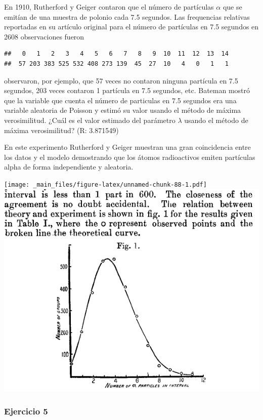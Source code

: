 \documentclass[
]{book}
\begin{document}
En 1910, Rutherford y Geiger contaron que el número de partículas \(\alpha\) que se emitían de una muestra de polonio cada 7.5 segundos. Las frequencias relativas reportadas en su artículo original para el número de partículas en 7.5 segundos en 2608 observaciones fueron

\begin{verbatim}
##   0   1   2   3   4   5   6   7   8   9  10  11  12  13  14 
##  57 203 383 525 532 408 273 139  45  27  10   4   0   1   1
\end{verbatim}

observaron, por ejemplo, que 57 veces no contaron ninguna partícula en 7.5 segundos, 203 veces contaron 1 partícula en 7.5 segundos, etc. Bateman mostró que la variable que cuenta el número de particulas en 7.5 segundos era una variable aleatoria de Poisson y estimó su valor usando el método de máxima verosimilitud. ¿Cuál es el valor estimado del parámetro \(\lambda\) usando el método de máxima verosimilitud? (R: 3.871549)

En este experimento Rutherford y Geiger muestran una gran coincidencia entre los datos y el modelo demostrando que los átomos radioactivos emiten partículas alpha de forma independiente y aleatoria.

\texttt{[image: \_main\_files/figure-latex/unnamed-chunk-88-1.pdf]}
\includegraphics{./figures/alpha.png}

\hypertarget{ejercicio-5-1}{%
\subsubsection{Ejercicio 5}\label{ejercicio-5-1}}
\end{document}
